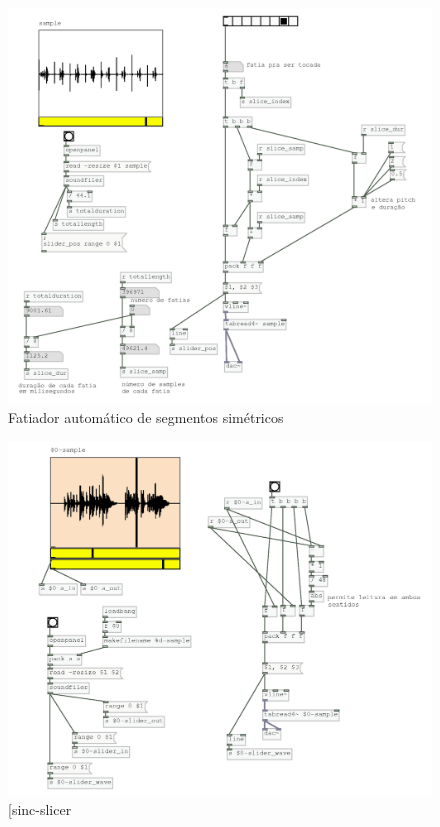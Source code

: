 \documentclass{ppgmus}
\begin{document}
\begin{figure}
\includegraphics[scale=.6]{slicer3}
\caption{Fatiador automático de segmentos simétricos}
\label{slicer3}
\end{figure}

\begin{figure}
\includegraphics[scale=.6]{sinc-slicer}
\caption{[sinc-slicer}
\label{sinc-slicer}
\end{figure}
\end{document}
